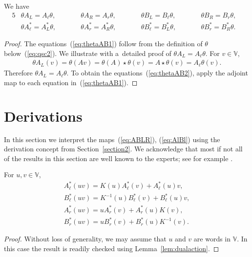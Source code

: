 \begin{Lemma}\label{lem:thetaAB}We have
\begin{alignat}{5}
&\theta A_L = A_\ell \theta,
\qquad &&
\theta A_R = A_r \theta,
\qquad &&
\theta B_L = B_\ell \theta,
\qquad &&
\theta B_R = B_r \theta,&
\label{eq:thetaAB1}
\\
& \theta A^*_\ell = A^*_L \theta,
\qquad &&
\theta A^*_r = A^*_R \theta,
\qquad &&
\theta B^*_\ell = B^*_L \theta,
\qquad &&
\theta B^*_r = B^*_R \theta.&\label{eq:thetaAB2}
\end{alignat}
\end{Lemma}
\begin{proof} The equations~(\ref{eq:thetaAB1}) follow from the definition of $\theta$ below~(\ref{eq:qsc2}). We illustrate with a~detailed proof of $\theta A_L = A_\ell \theta$. For $v \in \mathbb V$,
\begin{gather*}
\theta A_L (v) =
\theta(Av) =
\theta(A) \star \theta(v) =
A \star \theta(v)=
A_\ell \theta (v).
\end{gather*}
Therefore $\theta A_L = A_\ell \theta$. To obtain the equations~(\ref{eq:thetaAB2}), apply the adjoint map to each equation in~(\ref{eq:thetaAB1}).
\end{proof}

\section{Derivations}\label{section8}

In this section we interpret the maps~(\ref{eq:ABLR}),
(\ref{eq:AlBl})
using the derivation concept from
 Section~\ref{section2}. We acknowledge that most if not all of the results in
 this section are well known to the experts; see for example
 \cite[Sections~3 and~4]{green}.

\begin{Lemma}\label{lem:derAs}
For $u,v \in \mathbb V$,
\begin{gather*}
A^*_\ell (uv) =
K(u) A^*_\ell (v)
+A^*_\ell (u)v,
\\
B^*_\ell (uv) =
K^{-1}(u) B^*_\ell (v)+
B^*_\ell (u)v,
\\
A^*_r (uv) =
u A^*_r (v)+
A^*_r (u) K(v),
\\
B^*_r (uv) =
u B^*_r (v)+
B^*_r (u) K^{-1}(v).
\end{gather*}
\end{Lemma}
\begin{proof}Without loss of generality, we may assume that $u$ and $v$ are words in
$\mathbb V$. In this case the result is readily checked using
Lemma~\ref{lem:dualaction}.
\end{proof}

